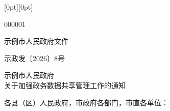 \documentclass[linespread=1.81, twoside]{ctexart}
\begin{document}
\noindent\raisebox{0pt}[0pt][0pt]{\parbox[t]{\textwidth}{%
  000001\\                        %
  \mbox{}}}\par
\vspace*{\dimexpr\gwlogodrop-\topskip-\baselineskip-5.5mm\relax}
{\centering\gwlogosize\xbsong\color{gwred}示例市人民政府文件\par}
\nointerlineskip
\vspace{\dimexpr 2\baselineskip-4mm\relax}
{\centering 示政发〔2026〕8号\par}
\nointerlineskip
\vspace{4mm}
\noindent{\color{gwred}\rule{\textwidth}{\gwredrule}}\par
\nointerlineskip

\vspace{\dimexpr 2\baselineskip-4mm\relax}
{\centering{}\xbsong\baselineskip=30bp
 示例市人民政府\\关于加强政务数据共享管理工作的通知\par}
\nointerlineskip
\par\nointerlineskip
\vspace{\baselineskip}
\noindent 各县（区）人民政府，市政府各部门，市直各单位：
\end{document}
